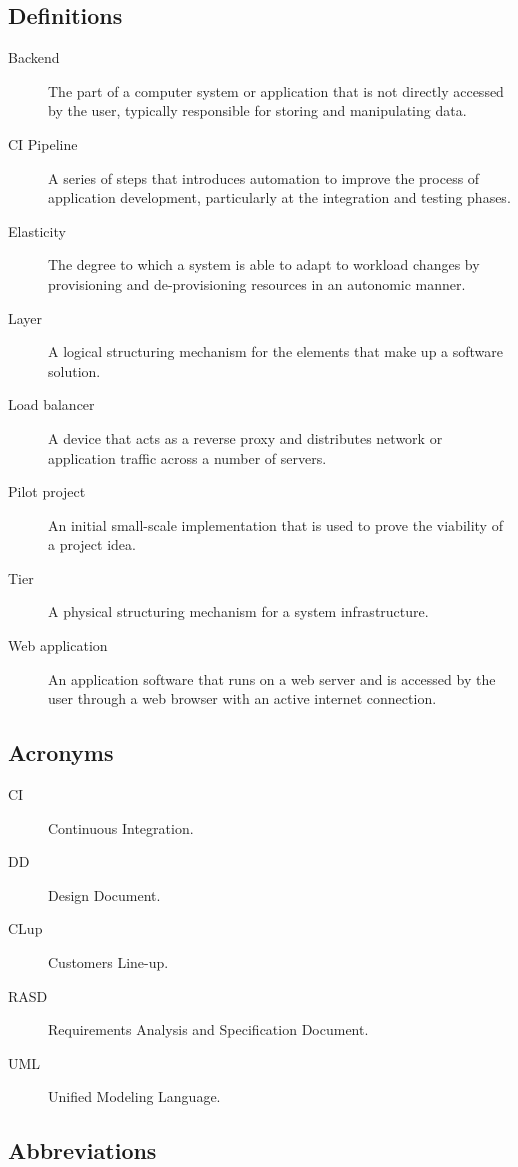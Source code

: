 \documentclass[../../main.tex]{subfiles}
\begin{document}
\subsection{Definitions}

\begin{description}

    \item[Backend] The part of a computer system or application that 
    is not directly accessed by the user, typically responsible for 
    storing and manipulating data.

    \item[CI Pipeline] A series of steps that introduces automation to improve the process of 
    application development, particularly at the integration and testing phases.
     
    \item[Elasticity] The degree to which a system is able to adapt to workload changes by provisioning and de-provisioning resources in an autonomic manner.

    \item[Layer] A logical structuring mechanism for the elements that make up a software solution.

    \item[Load balancer] A device that acts as a reverse proxy and 
    distributes network or application traffic across a number of servers.

    \item[Pilot project] An initial small-scale implementation that is used to 
    prove the viability of a project idea.

    \item[Tier] A physical structuring mechanism for a system infrastructure.

    \item[Web application] An application software that runs on a web server and is 
    accessed by the user through a web browser with an active internet connection.
    
\end{description}

\subsection{Acronyms}

\begin{description}

    \item[CI] Continuous Integration.

    \item[DD] Design Document.
    
    \item[CLup] Customers Line-up.
    
    \item[RASD] Requirements Analysis and Specification Document.
    
    \item[UML] Unified Modeling Language.

\end{description}

\subsection{Abbreviations}
\end{document}
